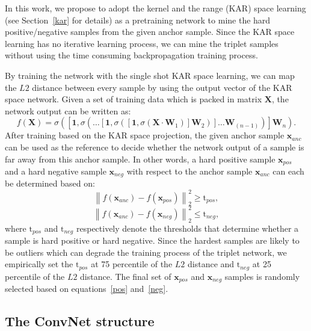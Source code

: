 \documentclass{sig-alternate-05-2015}
\begin{document}
In this work, we propose to adopt the kernel and the range (KAR) space learning (see Section~\ref{kar} for details) as a pretraining network to mine the hard positive/negative samples from the given anchor sample. Since the KAR space learning has no iterative learning process, we can mine the triplet samples without using the time consuming backpropagation training process.
 
By training the network with the single shot KAR space learning, we can map the $L2$ distance between every sample by using the output vector of the KAR space network. Given a set of training data which is packed in matrix $\mathbf{X}$, the network output can be written as:
\begin{equation}
    f\left(\mathbf{X}\right)=\sigma\left(\left[\mathbf{1},\sigma\left(\dots\left[\mathbf{1},\sigma\left(\left[\mathbf{1},\sigma\left(\mathbf{X}\cdot\mathbf{W}_{1}\right)\right]\mathbf{W}_{2}\right)\right]\dots\mathbf{W}_{(n-1)}\right)\right]\mathbf{W}_{n}\right).
\end{equation}
After training based on the KAR space projection, the given anchor sample $\mathbf{x}_{anc}$ can be used as the reference to decide whether the network output of a sample is far away from this anchor sample. In other words, a hard positive sample $\mathbf{x}_{pos}$ and a hard negative sample $\mathbf{x}_{neg}$ with respect to the anchor sample $\mathbf{x}_{anc}$ can each be determined based on:
\begin{equation}
    {\left\| {{f\left(\mathbf{x}_{anc}\right)} - {f\left(\mathbf{x}_{pos}\right)}} \right\|_2^2} \geq \mathrm{t}_{pos}, \label{pos}
\end{equation}
\begin{equation}
    {\left\| {{f\left(\mathbf{x}_{anc}\right)} - {f\left(\mathbf{x}_{neg}\right)}} \right\|_2^2} \leq \mathrm{t}_{neg},\label{neg}
\end{equation}
where $\mathrm{t}_{pos}$ and $\mathrm{t}_{neg}$ respectively denote the thresholds that determine whether a sample is hard positive or hard negative. Since the hardest samples are likely to be outliers which can degrade the training process of the triplet network, we empirically set the $\mathrm{t}_{pos}$ at 75 percentile of the $L2$ distance and $\mathrm{t}_{neg}$ at 25 percentile of the $L2$ distance. The final set of $\mathbf{x}_{pos}$ and $\mathbf{x}_{neg}$ samples is randomly selected based on equations~\eqref{pos} and~\eqref{neg}.

\subsection{The ConvNet structure}
\end{document}
